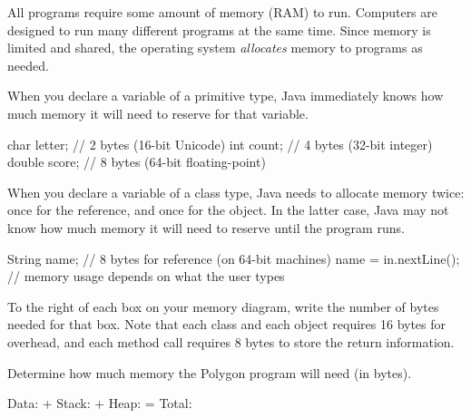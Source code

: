 All programs require some amount of memory (RAM) to run.
Computers are designed to run many different programs at the same time.
Since memory is limited and shared, the operating system \emph{allocates} memory to programs as needed.



When you declare a variable of a primitive type, Java immediately knows how much memory it will need to reserve for that variable.

\begin{javalst}
char letter;   // 2 bytes (16-bit Unicode)
int count;     // 4 bytes (32-bit integer)
double score;  // 8 bytes (64-bit floating-point)
\end{javalst}

When you declare a variable of a class type, Java needs to allocate memory twice: once for the reference, and once for the object. In the latter case, Java may not know how much memory it will need to reserve until the program runs.

\begin{javalst}
String name;           // 8 bytes for reference (on 64-bit machines)
name = in.nextLine();  // memory usage depends on what the user types
\end{javalst}




\Q To the right of each box on your memory diagram, write the number of bytes needed for that box. Note that each class and each object requires 16 bytes for overhead, and each method call requires 8 bytes to store the return information.


\Q Determine how much memory the Polygon program will need (in bytes).

\begin{center}
Data: \blank  +  Stack: \blank  +  Heap: \blank  =  Total: \blank
\end{center}
